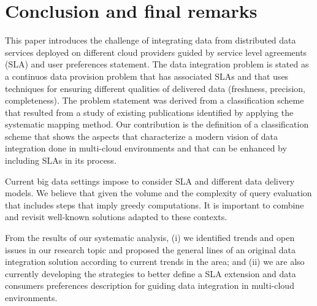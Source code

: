 \documentclass{llncs}
\begin{document}
\section{Conclusion and final remarks}\label{sec:conc}
This paper introduces the challenge of integrating data from distributed data
services deployed on different cloud providers guided by service level
agreements (SLA) and user preferences statement. The data integration problem
is stated as a continuos data provision problem that has associated SLAs and
that uses techniques for ensuring different qualities of delivered data
(freshness, precision, completeness). The problem statement was derived from a
classification scheme that resulted from a study of existing publications
identified by applying the systematic mapping method. 
Our contribution is the definition of a classification scheme that shows the
aspects that characterize a modern vision of data integration done in
multi-cloud environments and that can be enhanced by including SLAs in its
process.  

Current big data settings impose to consider SLA and different data delivery
models. We believe that given the volume and the complexity of query evaluation
that includes steps that imply greedy computations. It is important to combine
and revisit well-known solutions adapted to these contexts.

From the results of our systematic analysis, (i) we identified trends and open
issues in our research topic and proposed the general lines of an original data integration solution according to current
trends in the area; and (ii) we are also currently developing the strategies to
better define a SLA extension and data consumers preferences description for
guiding data integration in multi-cloud environments.
   



\end{document}
